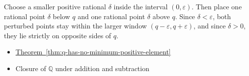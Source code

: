 \begin{remark*}
Choose a smaller positive rational $\delta$ inside the interval $(0,\varepsilon)$.
Then place one rational point $\delta$ below $q$ and one rational point
$\delta$ above $q$.  Since $\delta<\varepsilon$, both perturbed points stay
within the larger window $(q-\varepsilon,q+\varepsilon)$, and since
$\delta>0$, they lie strictly on opposite sides of $q$.
\end{remark*}

\begin{dependencies}
\begin{itemize}
  \item \hyperref[thm:q-has-no-minimum-positive-element]{Theorem~\ref*{thm:q-has-no-minimum-positive-element}}
  \item Closure of $\mathbb{Q}$ under addition and subtraction
\end{itemize}
\end{dependencies}

\clearpage
